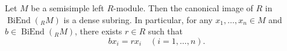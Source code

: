 Let $M$ be a semisimple left $R$-module. Then the canonical image of $R$ in $\operatorname{BiEnd}({}_R M)$ is a dense subring. In particular, for any $x_1, \ldots, x_n \in M$ and $b \in \operatorname{BiEnd}({}_R M)$, there exists $r \in R$ such that
$$b x_i = r x_i \quad (i = 1, \ldots, n).$$
